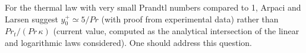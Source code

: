 

For the thermal law with very small Prandtl numbers compared to 1,
Arpaci and Larsen suggest $y_0^+ \simeq 5/Pr$ (with proof from
experimental data) rather than $Pr_t/(Pr\,\kappa)$  (current value,
computed as the analytical intersection of the linear and logarithmic
laws considered). One should address this question.


